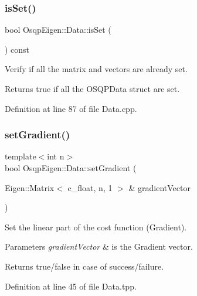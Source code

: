 \mbox{\label{classOsqpEigen_1_1Data_aac543c780466b0db451ca60f0a5753eb}} 
\subsubsection{\texorpdfstring{is\+Set()}{isSet()}}
{\footnotesize\ttfamily bool Osqp\+Eigen\+::\+Data\+::is\+Set (\begin{DoxyParamCaption}{ }\end{DoxyParamCaption}) const}



Verify if all the matrix and vectors are already set. 

\begin{DoxyReturn}{Returns}
true if all the O\+S\+Q\+P\+Data struct are set. 
\end{DoxyReturn}


Definition at line 87 of file Data.\+cpp.

\mbox{\label{classOsqpEigen_1_1Data_a46b476556b8f71326c6827285f10b970}} 
\subsubsection{\texorpdfstring{set\+Gradient()}{setGradient()}}
{\footnotesize\ttfamily template$<$int n$>$ \\
bool Osqp\+Eigen\+::\+Data\+::set\+Gradient (\begin{DoxyParamCaption}\item[{Eigen\+::\+Matrix$<$ c\+\_\+float, n, 1 $>$ \&}]{gradient\+Vector }\end{DoxyParamCaption})}



Set the linear part of the cost function (Gradient). 


\begin{DoxyParams}{Parameters}
{\em gradient\+Vector} & is the Gradient vector. \\
\hline
\end{DoxyParams}
\begin{DoxyReturn}{Returns}
true/false in case of success/failure. 
\end{DoxyReturn}


Definition at line 45 of file Data.\+tpp.

